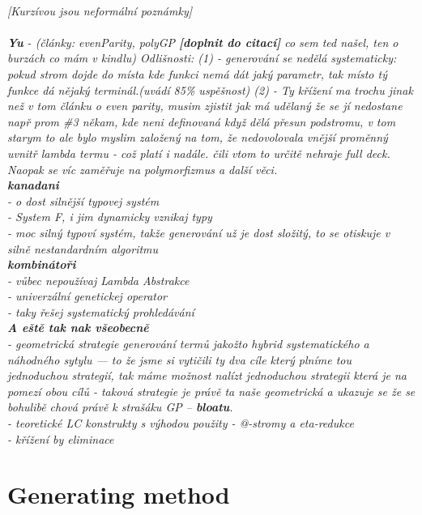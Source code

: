\documentclass[conference]{IEEEtran}
\begin{document}
~\\
\textit{[Kurzívou jsou neformální poznámky]\\\\
\textbf{Yu} - (články: evenParity, polyGP
\textbf{[doplnit do citací]}
 co sem ted našel, ten o burzách co mám v kindlu)
Odlišnosti:
(1) - generování se nedělá systematicky: pokud strom dojde do místa
kde funkci nemá dát jaký parametr, tak místo tý funkce dá nějaký 
terminál.(uvádí 85\% uspěšnost)  
(2) - Ty křížení ma trochu jinak než v tom článku o even parity,
musim zjistit jak má udělaný že se jí nedostane např prom \#3 někam,
kde neni definovaná když dělá přesun podstromu, v tom starym to ale 
bylo myslim založený na tom, že nedovolovala vnější proměnný uvnitř
lambda termu - což platí i nadále. čili vtom to určitě nehraje full deck.
Naopak se víc zaměřuje na polymorfizmus a další věci.\\
\textbf{kanadani}\\ 
- o dost silnější typovej systém\\
- System F, i jim dynamicky vznikaj typy\\
- moc silný typoví systém, takže generování už je dost
  složitý, to se otiskuje v silně nestandardním algoritmu\\
\textbf{kombinátoři} \\
- vůbec nepoužívaj Lambda Abstrakce\\
- univerzální genetickej operator\\
- taky řešej systematický prohledávání\\
\textbf{A eště tak nak všeobecně}\\
- geometrická strategie generování termů jakožto hybrid systematického a náhodného sytylu --- to že jsme si vytičili ty dva cíle který plníme tou 
jednoduchou strategií, tak máme možnost nalízt jednoduchou strategii která 
je na pomezí obou cílů - taková strategie je právě ta naše geometrická 
a ukazuje se že se bohulibě chová právě k strašáku GP -- \textbf{bloatu}.\\
- teoretické LC konstrukty s výhodou použity - @-stromy a eta-redukce\\
- křížení by eliminace 
}


 

\section{Generating method}
\end{document}
